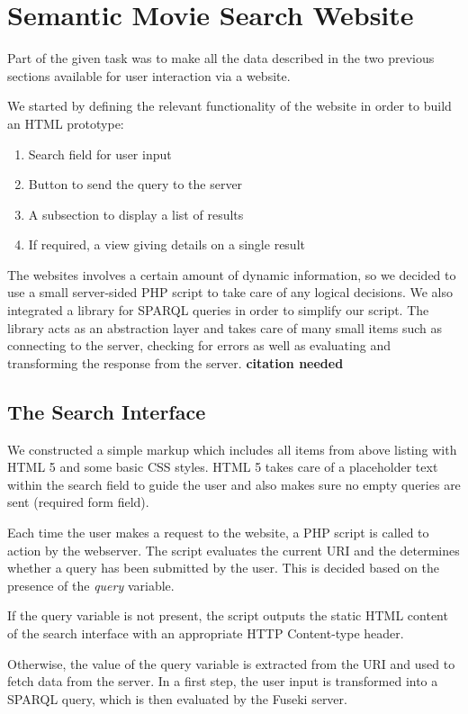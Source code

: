 \section{Semantic Movie Search Website}
Part of the given task was to make all the data described in the two previous sections available for user interaction via a website.

We started by defining the relevant functionality of the website in order to build an HTML prototype:

\begin{enumerate}
\item Search field for user input
\item Button to send the query to the server
\item A subsection to display a list of results
\item If required, a view giving details on a single result
\end{enumerate}

The websites involves a certain amount of dynamic information, so we decided to use a small server-sided PHP script to take care of any logical decisions. We also integrated a library for SPARQL queries in order to simplify our script. The library acts as an abstraction layer and takes care of many small items such as connecting to the server, checking for errors as well as evaluating and transforming the response from the server. \textbf{citation needed}

\subsection{The Search Interface}
We constructed a simple markup which includes all items from above listing with HTML 5 and some basic CSS styles. HTML 5 takes care of a placeholder text within the search field to guide the user and also makes sure no empty queries are sent (required form field).

Each time the user makes a request to the website, a PHP script is called to action by the webserver. The script evaluates the current URI and the determines whether a query has been submitted by the user. This is decided based on the presence of the \emph{query} variable.

If the query variable is not present, the script outputs the static HTML content of the search interface with an appropriate HTTP Content-type header.

Otherwise, the value of the query variable is extracted from the URI and used to fetch data from the server. In a first step, the user input is transformed into a SPARQL query, which is then evaluated by the Fuseki server.

